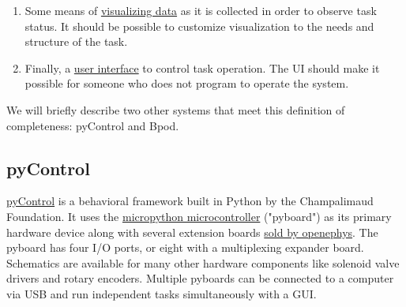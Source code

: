 \begin{enumerate}
\item Some means of \hyperref[sec:plotting]{visualizing data} as it is collected in order to  observe task status. It should be possible to customize visualization to the needs and structure of the task.
\item Finally, a \hyperref[sec:ui]{user interface} to control task operation. The UI should make it possible for someone who does not program to operate the system.
\end{enumerate}

We will briefly describe two other systems that meet this definition of completeness: pyControl and Bpod.

\subsection{pyControl}

\href{https://pycontrol.readthedocs.io/en/latest/}{pyControl}\citep{akamOpensourcePythonbasedHardware2022} is a behavioral framework built in Python by the Champalimaud Foundation. It uses the \href{https://micropython.org/}{micropython microcontroller} ("pyboard") as its primary hardware device along with several extension boards \href{http://www.open-ephys.org/store/pycontrol}{sold by openephys}. The pyboard has four I/O ports, or eight with a multiplexing expander board. Schematics are available for many other hardware components like solenoid valve drivers and rotary encoders. Multiple pyboards can be connected to a computer via USB and run independent tasks simultaneously with a GUI.

